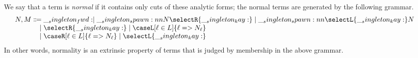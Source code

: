 We say that a term is \emph{normal} if it contains only cuts of these analytic forms;
the normal terms are generated by the following grammar.
\begin{equation*}
    N,M %
    \Coloneqq
    \begin{array}[t]{@{}l@{}}
      \fwd \mid \spawn{N}{\selectR{\kay}} \mid \spawn{\selectL{\kay}}{N} \\
      \begin{array}[t]{@{\mathllap{\mid {}}}l@{}}
        \selectR{\kay} \mid \caseL[\ell \in L]{\ell => N_{\ell}} \\
        \caseR[\ell \in L]{\ell => N_{\ell}} \mid \selectL{\kay}
      \end{array}
    \end{array}
\end{equation*}
In other words, normality is an extrinsic property of terms that is judged by membership in the above grammar.

